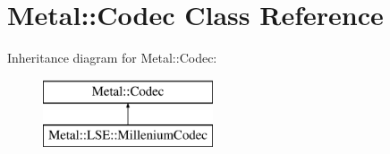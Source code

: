 \hypertarget{classMetal_1_1Codec}{}\section{Metal\+:\+:Codec Class Reference}
\label{classMetal_1_1Codec}
Inheritance diagram for Metal\+:\+:Codec\+:\begin{figure}[H]
\begin{center}
\leavevmode
\includegraphics[height=2.000000cm]{classMetal_1_1Codec}
\end{center}
\end{figure}
